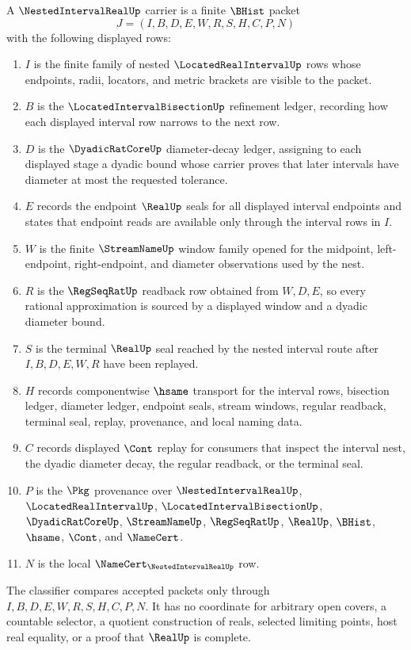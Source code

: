 \begin{definition}
\label{def:nested-interval-real-carrier}
A $\NestedIntervalRealUp$ carrier is a finite $\BHist$ packet
$$
J=(I,B,D,E,W,R,S,H,C,P,N)
$$
with the following displayed rows:
\begin{enumerate}
\item $I$ is the finite family of nested $\LocatedRealIntervalUp$ rows whose endpoints, radii, locators, and metric brackets are visible to the packet.
\item $B$ is the $\LocatedIntervalBisectionUp$ refinement ledger, recording how each displayed interval row narrows to the next row.
\item $D$ is the $\DyadicRatCoreUp$ diameter-decay ledger, assigning to each displayed stage a dyadic bound whose carrier proves that later intervals have diameter at most the requested tolerance.
\item $E$ records the endpoint $\RealUp$ seals for all displayed interval endpoints and states that endpoint reads are available only through the interval rows in $I$.
\item $W$ is the finite $\StreamNameUp$ window family opened for the midpoint, left-endpoint, right-endpoint, and diameter observations used by the nest.
\item $R$ is the $\RegSeqRatUp$ readback row obtained from $W,D,E$, so every rational approximation is sourced by a displayed window and a dyadic diameter bound.
\item $S$ is the terminal $\RealUp$ seal reached by the nested interval route after $I,B,D,E,W,R$ have been replayed.
\item $H$ records componentwise $\hsame$ transport for the interval rows, bisection ledger, diameter ledger, endpoint seals, stream windows, regular readback, terminal seal, replay, provenance, and local naming data.
\item $C$ records displayed $\Cont$ replay for consumers that inspect the interval nest, the dyadic diameter decay, the regular readback, or the terminal seal.
\item $P$ is the $\Pkg$ provenance over $\NestedIntervalRealUp$, $\LocatedRealIntervalUp$, $\LocatedIntervalBisectionUp$, $\DyadicRatCoreUp$, $\StreamNameUp$, $\RegSeqRatUp$, $\RealUp$, $\BHist$, $\hsame$, $\Cont$, and $\NameCert$.
\item $N$ is the local $\NameCert_{\NestedIntervalRealUp}$ row.
\end{enumerate}
The classifier compares accepted packets only through $I,B,D,E,W,R,S,H,C,P,N$. It has no coordinate for arbitrary open covers, a countable selector, a quotient construction of reals, selected limiting points, host real equality, or a proof that $\RealUp$ is complete.
\end{definition}


